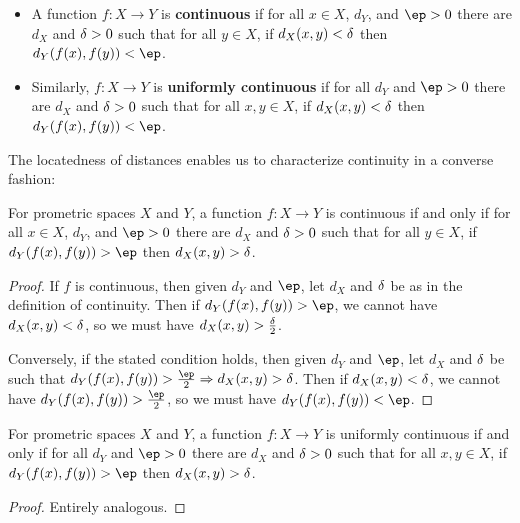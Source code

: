 \documentclass{article}
\let\implies\Rightarrow
\def\hfep{\frac{\ep}{2}}
\begin{document}
\begin{itemize}
\item A function $f:X\to Y$ is \textbf{continuous} if for all $x\in X$, $d_Y$, and $\ep>0$ there are $d_X$ and $\delta>0$ such that for all $y\in X$, if $d_X(x,y)<\delta$ then $d_Y(f(x),f(y))<\ep$.
\item Similarly, $f:X\to Y$ is \textbf{uniformly continuous} if for all $d_Y$ and $\ep>0$ there are $d_X$ and $\delta>0$ such that for all $x,y\in X$, if $d_X(x,y)<\delta$ then $d_Y(f(x),f(y))<\ep$.
\end{itemize}

The locatedness of distances enables us to characterize continuity in a converse fashion:

\begin{lem}\label{thm:cocontinuous}
  For prometric spaces $X$ and $Y$, a function $f:X\to Y$ is continuous if and only if for all $x\in X$, $d_Y$, and $\ep>0$ there are $d_X$ and $\delta>0$ such that for all $y\in X$, if $d_Y(f(x),f(y))>\ep$ then $d_X(x,y)>\delta$.
\end{lem}
\begin{proof}
  If $f$ is continuous, then given $d_Y$ and $\ep$, let $d_X$ and $\delta$ be as in the definition of continuity.
  Then if $d_Y(f(x),f(y)) > \ep$, we cannot have $d_X(x,y) < \delta$, so we must have $d_X(x,y) > \frac{\delta}{2}$.

  Conversely, if the stated condition holds, then given $d_Y$ and $\ep$, let $d_X$ and $\delta$ be such that $d_Y(f(x),f(y))>\hfep \implies d_X(x,y)>\de$.
  Then if $d_X(x,y)<\delta$, we cannot have $d_Y(f(x),f(y))>\hfep$, so we must have $d_Y(f(x),f(y))<\ep$.
\end{proof}

\begin{lem}\label{thm:unif-cocontinuous}
  For prometric spaces $X$ and $Y$, a function $f:X\to Y$ is uniformly continuous if and only if for all $d_Y$ and $\ep>0$ there are $d_X$ and $\delta>0$ such that for all $x,y\in X$, if $d_Y(f(x),f(y))>\ep$ then $d_X(x,y)>\delta$.
\end{lem}
\begin{proof}
  Entirely analogous.
\end{proof}
\end{document}
